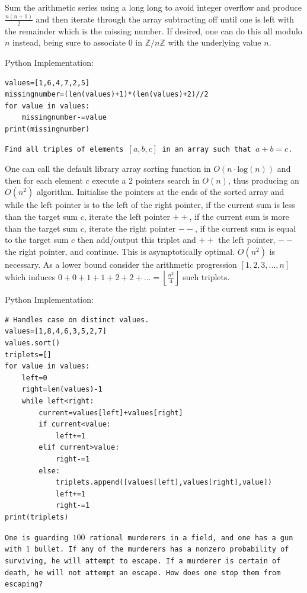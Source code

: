 Sum the arithmetic series using a long long to avoid integer overflow and produce $\frac{n(n+1)}{2}$ and then iterate through the array subtracting off until one is left with the remainder which is the missing number. If desired, one can do this all modulo $n$ instead, being sure to associate $0$ in $\mathbb{Z}/n\mathbb{Z}$ with the underlying value $n$.

Python Implementation:

\begin{verbatim}
values=[1,6,4,7,2,5]
missingnumber=(len(values)+1)*(len(values)+2)//2
for value in values:
    missingnumber-=value
print(missingnumber)
\end{verbatim}

\texttt{Find all triples of elements $[a,b,c]$ in an array such that $a+b=c$.}

One can call the default library array sorting function in $O(n \cdot \text{log}(n))$ and then for each element $c$ execute a $2$ pointers search in $O(n)$, thus producing an $O(n^2)$ algorithm. Initialise the pointers at the ends of the sorted array and while the left pointer is to the left of the right pointer, if the current sum is less than the target sum $c$, iterate the left pointer $++$, if the current sum is more than the target sum $c$, iterate the right pointer $--$, if the current sum is equal to the target sum $c$ then add/output this triplet and $++$ the left pointer, $--$ the right pointer, and continue. This is asymptotically optimal. $O(n^2)$ is necessary. As a lower bound consider the arithmetic progression $[1,2,3,...,n]$ which induces $0+0+1+1+2+2+\dots = \left \lfloor \frac{n^2}{4} \right \rfloor$ such triplets.

Python Implementation:

\begin{verbatim}
# Handles case on distinct values.
values=[1,8,4,6,3,5,2,7]
values.sort()
triplets=[]
for value in values:
    left=0
    right=len(values)-1
    while left<right:
        current=values[left]+values[right]
        if current<value:
            left+=1
        elif current>value:
            right-=1
        else:
            triplets.append([values[left],values[right],value])
            left+=1
            right-=1
print(triplets)
\end{verbatim}

\texttt{One is guarding $100$ rational murderers in a field, and one has a gun with $1$ bullet. If any of the murderers has a nonzero probability of surviving, he will attempt to escape. If a murderer is certain of death, he will not attempt an escape. How does one stop them from escaping?}

